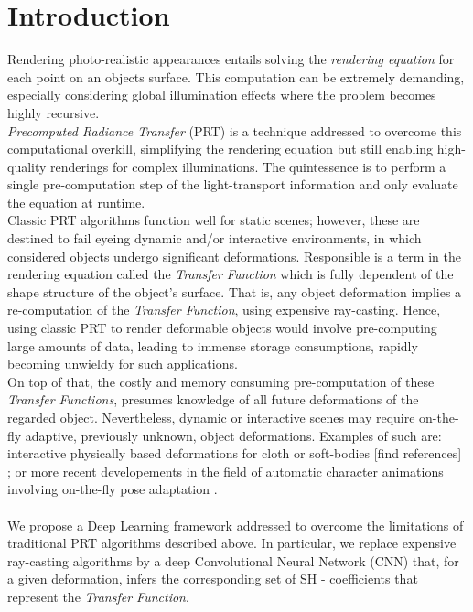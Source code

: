 \section{Introduction}

Rendering photo-realistic appearances entails solving the \textit{rendering equation} for each point on an objects surface. This computation can be extremely demanding, especially considering global illumination effects where the problem becomes highly recursive. \\
\textit{Precomputed Radiance Transfer} (PRT) is a technique addressed to overcome this computational overkill, simplifying the rendering equation but still enabling high-quality renderings for complex illuminations. The quintessence is to perform a single pre-computation step of the light-transport information and only evaluate the equation at runtime.\\
Classic PRT algorithms function well for static scenes; however, these are destined to fail eyeing dynamic and/or interactive environments, in which considered objects undergo significant deformations.
Responsible is a term in the rendering equation called the \textit{Transfer Function} which is fully dependent of the shape structure of the object's surface. That is, any object deformation implies a re-computation of the \textit{Transfer Function},  using expensive ray-casting. Hence, using classic PRT to render deformable objects would involve pre-computing large amounts of data, leading to immense storage consumptions, rapidly becoming unwieldy for such applications.  \\
On top of that, the costly and memory consuming pre-computation of these \textit{Transfer Functions}, presumes knowledge of all future deformations of the regarded object. Nevertheless, dynamic or interactive scenes may require on-the-fly adaptive, previously unknown, object deformations. Examples of such are: 
interactive physically based deformations for cloth or soft-bodies [find references] ; 
or more recent developements in the field of automatic character animations involving on-the-fly pose adaptation \cite{DeepHuman,Holden2017, QuadrupedMotion}. \\
\\
We propose a Deep Learning framework addressed to overcome the limitations of traditional PRT algorithms described above. In particular, we replace expensive ray-casting algorithms by a deep Convolutional Neural Network (CNN) that, for a given deformation, infers the corresponding set of SH - coefficients that represent the \textit{Transfer Function}. 
